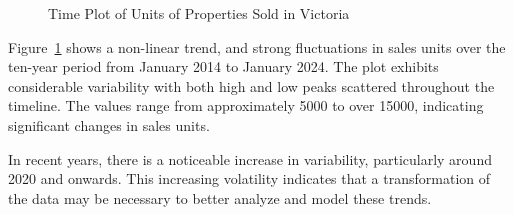 \documentclass[
  11pt,
  a4paper,
]{article}
\begin{document}
\begin{figure}


\caption{\label{fig-salestrend}Time Plot of Units of Properties Sold in
Victoria}

\end{figure}%

Figure~\ref{fig-salestrend} shows a non-linear trend, and strong
fluctuations in sales units over the ten-year period from January 2014
to January 2024. The plot exhibits considerable variability with both
high and low peaks scattered throughout the timeline. The values range
from approximately 5000 to over 15000, indicating significant changes in
sales units.

In recent years, there is a noticeable increase in variability,
particularly around 2020 and onwards. This increasing volatility
indicates that a transformation of the data may be necessary to better
analyze and model these trends.
\end{document}
